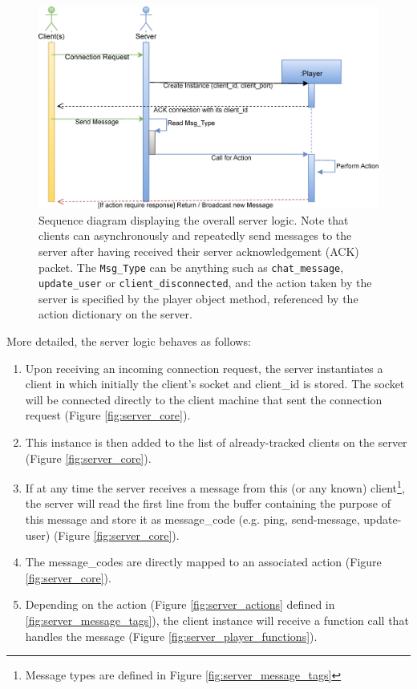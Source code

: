 \documentclass[bsc, 12pt, twoside, singlespacing, parskip, abbrevs, notimes, normalheadings, logo]{styles/infthesis}
\begin{document}
\begin{figure}[H]
\includegraphics[scale=0.3]{images/server_sequence_diagram2.eps}
\caption{Sequence diagram displaying the overall server logic. Note that clients can asynchronously and repeatedly send messages to the server after having received their server acknowledgement (ACK) packet. The \texttt{Msg\_Type} can be anything such as \texttt{chat\_message}, \texttt{update\_user} or \texttt{client\_disconnected}, and the action taken by the server is specified by the player object method, referenced by the action dictionary on the server.}
\label{fig:server_sequence_diagram}
\end{figure}
More detailed, the server logic behaves as follows:
\begin{enumerate}
\item Upon receiving an incoming connection request, the server instantiates a client in which initially the client's socket and client\_id is stored. The socket will be connected directly to the client machine that sent the connection request (Figure \ref{fig:server_core}).
\item This instance is then added to the list of already-tracked clients on the server (Figure \ref{fig:server_core}).
\item If at any time the server receives a message from this (or any known) client\footnote{Message types are defined in Figure \ref{fig:server_message_tags}}, the server will read the first line from the buffer containing the purpose of this message and store it as message\_code (e.g. ping, send-message, update-user) (Figure \ref{fig:server_core}).
\item The message\_codes are directly mapped to an associated action (Figure \ref{fig:server_core}).
\item Depending on the action (Figure \ref{fig:server_actions} defined in \ref{fig:server_message_tags}), the client instance will receive a function call that handles the message (Figure \ref{fig:server_player_functions}).
\end{enumerate}
\end{document}
